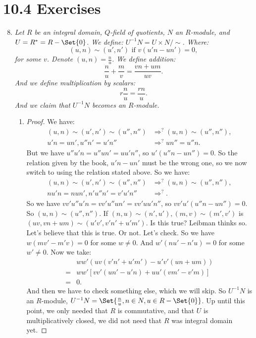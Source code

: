 \documentclass[9pt,reqno,twoside]{amsbook}
\theoremstyle{plain}
\numberwithin{section}{chapter}
\numberwithin{equation}{chapter}
\theoremstyle{definition}
\theoremstyle{remark}
\theoremstyle{plain}
\newcommand{\bee}{\begin{equation}\begin{aligned}}
\newcommand{\eee}{\end{aligned}\end{equation}}
\newcommand{\fracc}{\frac}
\begin{document}
\section*{10.4 Exercises}
\begin{enumerate}[label=\arabic*.]


\setcounter{enumi}{7}

\item \textit{Let $R$ be an integral domain, $Q$-field of quotients, $N$ an $R$-module, and $U = R^* = R - \Set{0}$. We define: $U^{-1}N = U \times N/\sim$. Where: 
$$
(u,n) \sim (u',n') \text{ if } v(u'n - un') = 0,
$$
for some $v$. Denote $(u,n) = \fracc{n}{u}$. We define addition: 
$$
\fracc{n}{u}+\fracc{m}{v} = \fracc{vn + um}{uv}.
$$
And we define multiplication by scalars: 
$$
r\fracc{n}{u} = \fracc{rn}{u}.
$$
And we claim that $U^{-1}N$ becomes an $R$-module. 
}

\begin{enumerate}
\item 

\begin{proof}
We have: 
\bee
(u,n) \sim (u',n') \sim (u'',n'') &\Rightarrow^{?} (u,n) \sim (u'',n''),\\
u'n = un',u''n' = u'n'' &\Rightarrow^{?} un'' = u''n.
\eee
But we have $u''u'n = u''un' = uu'n''$, so $u'(u''n - un'') = 0$. So the relation given by the book, $u'n - un'$ must be the wrong one, so we now switch to using the relation stated above. So we have: 
\bee
(u,n) \sim (u',n') \sim (u'',n'')& \Rightarrow^{?} (u,n) \sim (u'',n''),\\
nu'n = nun',n'u''n' = v'u'n'' &\Rightarrow^{?}.
\eee
So we have $vv'u''u'n = vv'u''un' = vv'uu'n''$, so $vv'u'(u''n - un'') = 0$. So $(u,n) \sim (u'',n'')$. If $(n,u) \sim (n',u'),(m,v) \sim (m',v')$ is $(uv,vn + um) \sim (u'v',v'n' + u'm')$. Is this true? Leibman thinks so. Let's believe that this is true. Or not. Let's check. So we have $w(mv' - m'v) = 0$ for some $w \neq 0$. And $w'(nu' - n'u) = 0$ for some $w' \neq 0$. Now we take:
\bee
&ww'(uv(v'n' + u'm') - u'v'(un + um))\\ =&ww'[vv'(un' - u'n) + uu'(vm' - v'm)]\\
 =& 0.
\eee
And then we have to check something else, which we will skip. So $U^{-1}N$ is an $R$-module, $U^{-1}N = \Set{\fracc{n}{u},n \in N,u \in R - \Set{0}}$. Up until this point, we only needed that $R$ is commutative, and that $U$ is multiplicatively closed, we did not need that $R$ was integral domain yet. 

\end{proof}


\end{enumerate}
\end{enumerate}
\end{document}
